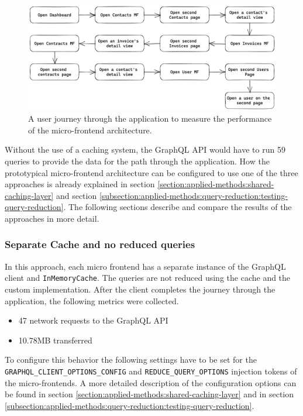 \ifshowImages
\begin{figure}[H]
\centering
\includegraphics[width=1\linewidth]{images/results/evaluation-first-path.png}
\caption{A user journey through the application to measure the performance of the micro-frontend architecture.}\label{fig:results:evaluation-first-path}
\end{figure}
\fi

\noindent Without the use of a caching system, the GraphQL \ac{API} would have to run 59 queries to provide the data for the path through the application. How the prototypical micro-frontend architecture can be configured to use one of the three approaches is already explained in section \ref{section:applied-methods:shared-caching-layer} and section \ref{subsection:applied-methods:query-reduction:testing-query-reduction}. The following sections describe and compare the results of the approaches in more detail.

\subsubsection{Separate Cache and no reduced queries}\label{subsubsection:results:performance-measurement:separate-cache-no-reduction}

In this approach, each micro frontend has a separate instance of the GraphQL client and \texttt{InMemoryCache}. The queries are not reduced using the cache and the custom implementation. After the client completes the journey through the application, the following metrics were collected.

\begin{itemize}
  \item 47 network requests to the GraphQL \ac{API}
  \item 10.78MB transferred
\end{itemize}

\noindent To configure this behavior the following settings have to be set for the \texttt{GRAPHQL\_CLIENT\_OPTIONS\_CONFIG} and \texttt{REDUCE\_QUERY\_OPTIONS} injection tokens of the micro-frontends. A more detailed description of the configuration options can be found in section \ref{section:applied-methods:shared-caching-layer} and in section \ref{subsection:applied-methods:query-reduction:testing-query-reduction}.

